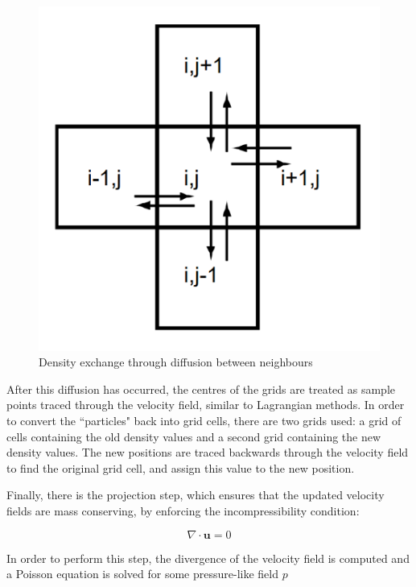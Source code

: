 \documentclass[a4paper, 12pt]{article}
\begin{document}
    \begin{figure}[H]
        \begin{center}
            \includegraphics{neighbourDiff.png}
            \caption{Density exchange through diffusion between neighbours \cite{stam}}
        \end{center}   
    \end{figure}

    After this diffusion has occurred, the centres of the grids are treated as sample points traced through the velocity field, similar to Lagrangian methods. In order to convert the ``particles" back into grid cells, there are two grids used: a grid of cells containing the old density values and a second grid containing the new density values. The new positions are traced backwards through the velocity field to find the original grid cell, and assign this value to the new position.

    Finally, there is the projection step, which ensures that the updated velocity fields are mass conserving, by enforcing the incompressibility condition: 
    
    \begin{equation}
        \nabla \cdot \textbf{u} = 0
    \end{equation}
    
    In order to perform this step, the divergence of the velocity field is computed and a Poisson equation is solved for some pressure-like field $p$
    
\end{document}

